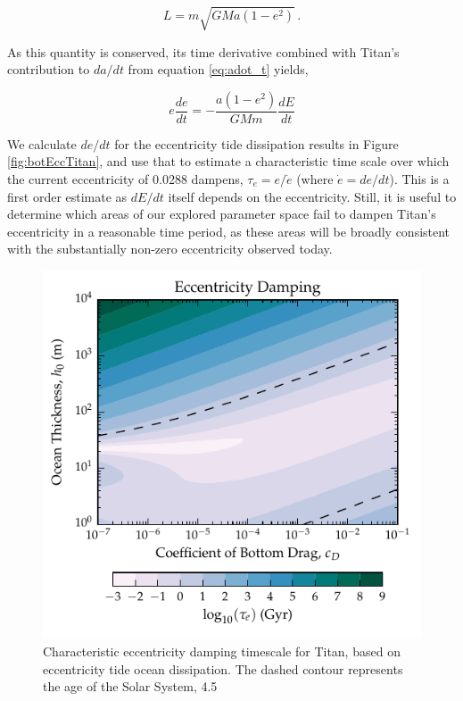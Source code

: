 \begin{equation}\label{eq:ang_mom}
L = m \sqrt{G M a (1-e^2)} \, .
\end{equation}

As this quantity is conserved, its time derivative combined with Titan's contribution to $da/dt$ from equation \ref{eq:adot_t} yields,

\begin{equation}\label{eq:adot_edot}
e\dfrac{de}{dt} = - \dfrac{a (1-e^2)}{GMm} \dfrac{dE}{dt}
\end{equation}

We calculate $de/dt$ for the eccentricity tide dissipation results in Figure \ref{fig:botEccTitan}, and use that to estimate a characteristic time scale over which the current eccentricity of 0.0288 dampens, $\tau_e = e/\dot{e}$ (where $\dot{e} = de/dt$). This is a first order estimate as $dE/dt$ itself depends on the eccentricity. Still, it is useful to determine which areas of our explored parameter space fail to dampen Titan's eccentricity in a reasonable time period, as these areas will be broadly consistent with the substantially non-zero eccentricity observed today.

\begin{figure}[!t]
\centering
\includegraphics[width=0.55\linewidth]{Figures/eccentricity}
\caption{Characteristic eccentricity damping timescale for Titan, based on eccentricity tide ocean dissipation. The dashed contour represents the age of the Solar System, \SI{4.5}{\giga\year} \label{fig:edotTitan}}
\end{figure}

